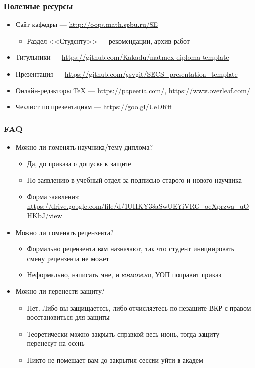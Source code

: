 \documentclass[xetex,mathserif,serif]{beamer}
\begin{document}
    \begin{frame}
        \frametitle{Полезные ресурсы}
        \begin{itemize}
            \item Сайт кафедры --- \url{http://oops.math.spbu.ru/SE}
            \begin{itemize}
                \item Раздел <<Студенту>> --- рекомендации, архив работ
            \end{itemize}
            \item Титульники --- \url{https://github.com/Kakadu/matmex-diploma-template}
            \item Презентация --- \url{https://github.com/gsvgit/SECS_presentation_template}
            \item Онлайн-редакторы TeX --- \url{https://papeeria.com/}, \url{https://www.overleaf.com/}
            \item Чеклист по презентациям --- \url{https://goo.gl/UeDRff}
        \end{itemize}
    \end{frame}

    \begin{frame}
        \frametitle{FAQ}
        \begin{itemize}
            \item Можно ли поменять научника/тему диплома?
            \begin{itemize}
                \item Да, до приказа о допуске к защите
                \item По заявлению в учебный отдел за подписью старого и нового научника 
                \item Форма заявления: \url{https://drive.google.com/file/d/1UHKY38aSwUEYiVRG_oeXprzwa_uOHKbJ/view}
            \end{itemize}
            \item Можно ли поменять рецензента?
            \begin{itemize}
                \item Формально рецензента вам назначают, так что студент инициировать смену рецензента не может
                \item Неформально, написать мне, и \textit{возможно}, УОП поправит приказ
            \end{itemize}
            \item Можно ли перенести защиту?
            \begin{itemize}
                \item Нет. Либо вы защищаетесь, либо отчисляетесь по незащите ВКР с правом восстановиться для защиты
                \item Теоретически можно закрыть справкой весь июнь, тогда защиту перенесут на осень
                \item Никто не помешает вам до закрытия сессии уйти в академ
            \end{itemize}
        \end{itemize}
    \end{frame}
\end{document}
